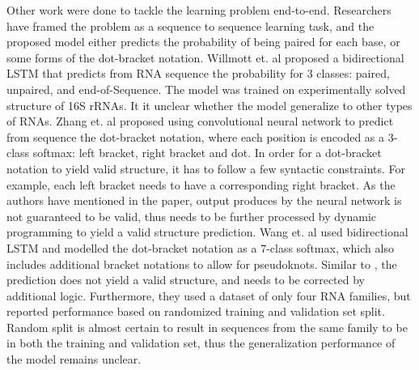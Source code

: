 \documentclass{article}
\begin{document}
Other work were done to tackle the learning problem end-to-end.
Researchers have framed the problem as a sequence to sequence learning task,
and the proposed model either predicts the probability of being paired for each base,
or some forms of the dot-bracket notation.
Willmott et. al\cite{willmottstate} proposed a bidirectional LSTM that predicts
from RNA sequence the probability for 3 classes: paired, unpaired, and end-of-Sequence.
The model was trained on experimentally solved structure of 16S rRNAs.
It it unclear whether the model generalize to other types of RNAs.
Zhang et. al\cite{zhang2019new} proposed using convolutional neural network to predict from sequence
the dot-bracket notation, where each position is encoded as a 3-class softmax: left bracket, right bracket and dot.
In order for a dot-bracket notation to yield valid structure, it has to follow a few syntactic constraints.
For example, each left bracket needs to have a corresponding right bracket.
As the authors have mentioned in the paper, output produces by the neural network
is not guaranteed to be valid, thus needs to be further processed by dynamic programming
to yield a valid structure prediction.
Wang et. al\cite{wang2019dmfold} used bidirectional LSTM and modelled the dot-bracket notation as a
7-class softmax, which also includes additional bracket notations to allow for pseudoknots.
Similar to \cite{zhang2019new}, the prediction does not yield a valid structure, and needs to be corrected by additional logic.
Furthermore, they used a dataset of only four RNA families,
but reported performance based on randomized training and validation set split.
Random split is almost certain to result in sequences from the same family to be in both the training and validation set,
thus the generalization performance of the model remains unclear.







\end{document}
